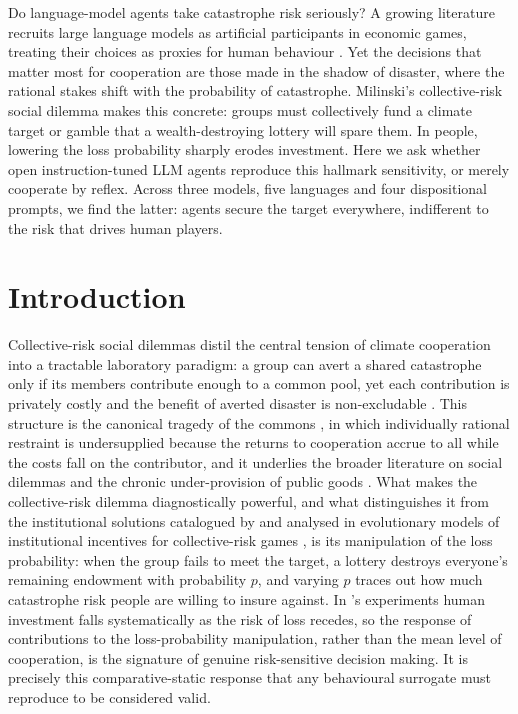 \documentclass[openacc]{rsproca_new}
\begin{document}
\begin{fmtext}
Do language-model agents take catastrophe risk seriously? A growing literature recruits large language models as artificial participants in economic games, treating their choices as proxies for human behaviour \cite{argyle2023out,horton2023llm,aher2023using,park2023generative}. Yet the decisions that matter most for cooperation are those made in the shadow of disaster, where the rational stakes shift with the probability of catastrophe. Milinski's collective-risk social dilemma \cite{milinski2008climate} makes this concrete: groups must collectively fund a climate target or gamble that a wealth-destroying lottery will spare them. In people, lowering the loss probability sharply erodes investment. Here we ask whether open instruction-tuned LLM agents reproduce this hallmark sensitivity, or merely cooperate by reflex. Across three models, five languages and four dispositional prompts, we find the latter: agents secure the target everywhere, indifferent to the risk that drives human players.
\end{fmtext}

\maketitle

\section{Introduction}

Collective-risk social dilemmas distil the central tension of climate cooperation into a tractable laboratory paradigm: a group can avert a shared catastrophe only if its members contribute enough to a common pool, yet each contribution is privately costly and the benefit of averted disaster is non-excludable \cite{milinski2008climate}. This structure is the canonical tragedy of the commons \cite{hardin1968tragedy}, in which individually rational restraint is undersupplied because the returns to cooperation accrue to all while the costs fall on the contributor, and it underlies the broader literature on social dilemmas \cite{dawes1980social} and the chronic under-provision of public goods \cite{ledyard1995public}. What makes the collective-risk dilemma diagnostically powerful, and what distinguishes it from the institutional solutions catalogued by \textcite{ostrom1990governing} and analysed in evolutionary models of institutional incentives for collective-risk games \cite{duong2026cost}, is its manipulation of the loss probability: when the group fails to meet the target, a lottery destroys everyone's remaining endowment with probability $p$, and varying $p$ traces out how much catastrophe risk people are willing to insure against. In \textcite{milinski2008climate}'s experiments human investment falls systematically as the risk of loss recedes, so the response of contributions to the loss-probability manipulation, rather than the mean level of cooperation, is the signature of genuine risk-sensitive decision making. It is precisely this comparative-static response that any behavioural surrogate must reproduce to be considered valid.
\end{document}
